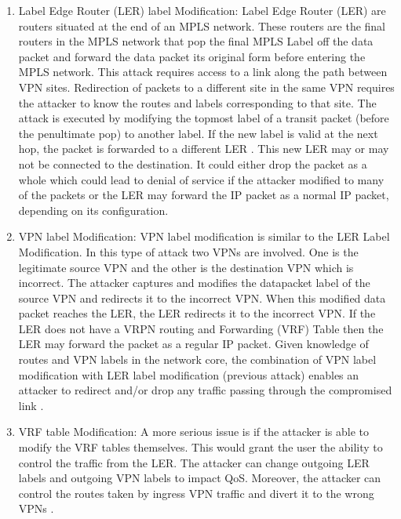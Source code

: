 \begin{enumerate}
\item Label Edge Router (LER) label Modification:
Label Edge Router (LER) are routers situated at the end of an MPLS network. These routers are the final routers in the MPLS network that pop the final MPLS Label off the data packet and forward the data packet its original form before entering the MPLS network. This attack requires access to a link
along the path between VPN sites. Redirection of packets to a different site in the same VPN requires the attacker to know the routes and labels corresponding to that site. The attack is executed by modifying the topmost label of a transit packet (before the penultimate pop) to another label. If the new label is valid at the next hop, the packet is forwarded to a different LER \cite{grayson2009analysis}. This new LER may or may not be connected to the destination. It could either drop the packet as a whole which could lead to denial of service if the attacker modified to many of the packets or the LER may forward the IP packet as a normal IP packet, depending on its configuration.

\item VPN label Modification:
VPN label modification is similar to the LER Label Modification. In this type of attack two VPNs are involved. One is the legitimate source VPN and the other is the destination VPN which is incorrect. The attacker captures and modifies the datapacket label of the source VPN and redirects it to the incorrect VPN. When this modified data packet reaches the LER, the LER redirects it to the incorrect VPN. If the LER does not have a VRPN routing and Forwarding (VRF) Table then the LER may forward the packet as a regular IP packet. Given knowledge of routes and VPN labels in the network core, the combination of VPN label modification with LER label modification (previous attack) enables an attacker to redirect and/or drop any traffic passing through the compromised link \cite{grayson2009analysis}.

\item VRF table Modification:
A more serious issue is if the attacker is able to modify the VRF tables themselves. This would grant the user the ability to control the traffic from the LER. The attacker can change outgoing LER labels and outgoing VPN labels to impact QoS. Moreover, the attacker can control the routes taken by ingress VPN traffic and divert it to the wrong VPNs \cite{grayson2009analysis}.
\end{enumerate}

